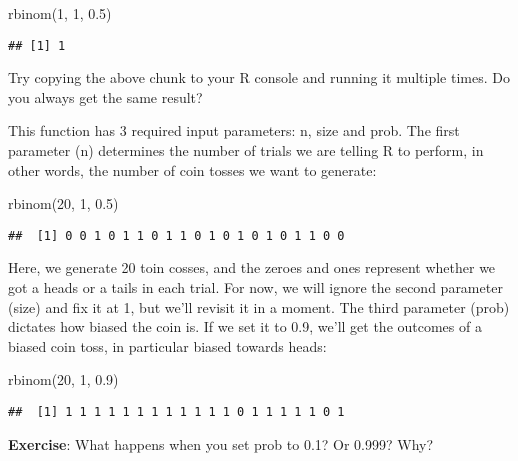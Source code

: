 \documentclass[
]{book}
\newenvironment{Shaded}{\begin{snugshade}}{\end{snugshade}}
\newcommand{\DecValTok}[1]{\textcolor[rgb]{0.00,0.00,0.81}{#1}}
\newcommand{\FloatTok}[1]{\textcolor[rgb]{0.00,0.00,0.81}{#1}}
\newcommand{\FunctionTok}[1]{\textcolor[rgb]{0.00,0.00,0.00}{#1}}
\newcommand{\NormalTok}[1]{#1}
\begin{document}
\begin{Shaded}
\begin{Highlighting}[]
\FunctionTok{rbinom}\NormalTok{(}\DecValTok{1}\NormalTok{, }\DecValTok{1}\NormalTok{, }\FloatTok{0.5}\NormalTok{)}
\end{Highlighting}
\end{Shaded}

\begin{verbatim}
## [1] 1
\end{verbatim}

Try copying the above chunk to your R console and running it multiple times. Do you always get the same result?

This function has 3 required input parameters: n, size and prob. The first parameter (n) determines the number of trials we are telling R to perform, in other words, the number of coin tosses we want to generate:

\begin{Shaded}
\begin{Highlighting}[]
\FunctionTok{rbinom}\NormalTok{(}\DecValTok{20}\NormalTok{, }\DecValTok{1}\NormalTok{, }\FloatTok{0.5}\NormalTok{)}
\end{Highlighting}
\end{Shaded}

\begin{verbatim}
##  [1] 0 0 1 0 1 1 0 1 1 0 1 0 1 0 1 0 1 1 0 0
\end{verbatim}

Here, we generate 20 toin cosses, and the zeroes and ones represent whether we got a heads or a tails in each trial. For now, we will ignore the second parameter (size) and fix it at 1, but we'll revisit it in a moment. The third parameter (prob) dictates how biased the coin is. If we set it to 0.9, we'll get the outcomes of a biased coin toss, in particular biased towards heads:

\begin{Shaded}
\begin{Highlighting}[]
\FunctionTok{rbinom}\NormalTok{(}\DecValTok{20}\NormalTok{, }\DecValTok{1}\NormalTok{, }\FloatTok{0.9}\NormalTok{)}
\end{Highlighting}
\end{Shaded}

\begin{verbatim}
##  [1] 1 1 1 1 1 1 1 1 1 1 1 1 0 1 1 1 1 1 0 1
\end{verbatim}

\textbf{Exercise}: What happens when you set prob to 0.1? Or 0.999? Why?
\end{document}
